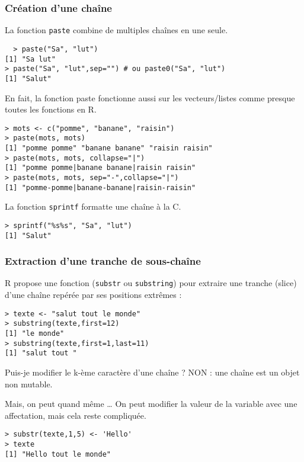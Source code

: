 \documentclass[10pt]{beamer}
\begin{document}
\begin{frame}[fragile]
  \frametitle{Création d'une chaîne}
  La fonction \alert{\texttt{paste}} combine de multiples chaînes en une seule.
  \begin{lstlisting}
  > paste("Sa", "lut")
[1] "Sa lut"
> paste("Sa", "lut",sep="") # ou paste0("Sa", "lut")
[1] "Salut"
\end{lstlisting}
En fait, la fonction paste fonctionne aussi sur les vecteurs/listes comme presque toutes les fonctions en R.
\begin{lstlisting}
> mots <- c("pomme", "banane", "raisin")
> paste(mots, mots)
[1] "pomme pomme" "banane banane" "raisin raisin"
> paste(mots, mots, collapse="|")
[1] "pomme pomme|banane banane|raisin raisin"
> paste(mots, mots, sep="-",collapse="|")
[1] "pomme-pomme|banane-banane|raisin-raisin"  
\end{lstlisting}
La fonction \alert{\texttt{sprintf}} formatte une chaîne à la C.
\begin{lstlisting}
> sprintf("%s%s", "Sa", "lut")
[1] "Salut"
\end{lstlisting}
\end{frame}

\begin{frame}[fragile]
  \frametitle{Extraction d'une tranche de sous-chaîne}
  R propose une fonction (\alert{\texttt{substr}} ou \alert{\texttt{substring}}) pour extraire une tranche (slice) d'une chaîne repérée par ses positions extrêmes :
  \begin{lstlisting}
> texte <- "salut tout le monde"
> substring(texte,first=12)
[1] "le monde"
> substring(texte,first=1,last=11)
[1] "salut tout "    
\end{lstlisting}

\begin{alertblock}{Puis-je modifier le k-ème caractère d'une chaîne ?}
  \alert{NON} : une chaîne est un objet non mutable. 
\end{alertblock}

\begin{exampleblock}{Mais, on peut quand même \dots}
  On peut modifier la valeur de la variable avec une affectation, mais cela reste compliquée.
  \begin{lstlisting}
> substr(texte,1,5) <- 'Hello'
> texte
[1] "Hello tout le monde"    
  \end{lstlisting}
\end{exampleblock}
\end{frame}
\end{document}
